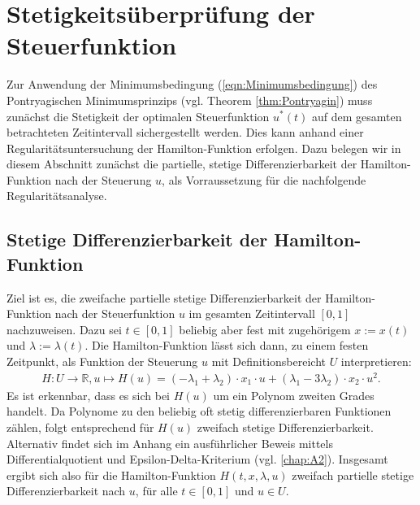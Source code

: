 \section{Stetigkeitsüberprüfung der Steuerfunktion} \label{sec:Stetigkeit}
Zur Anwendung der Minimumsbedingung (\ref{eqn:Minimumsbedingung}) des Pontryagischen Minimumsprinzips (vgl. Theorem \ref{thm:Pontryagin}) muss zunächst die Stetigkeit der optimalen Steuerfunktion $u^*(t)$ auf dem gesamten betrachteten Zeitintervall sichergestellt werden.
Dies kann anhand einer Regularitätsuntersuchung der Hamilton-Funktion erfolgen. Dazu belegen wir in diesem Abschnitt zunächst die partielle, stetige Differenzierbarkeit der Hamilton-Funktion nach der Steuerung $u$, als Vorraussetzung für die nachfolgende Regularitätsanalyse.  
\subsection{Stetige Differenzierbarkeit der Hamilton-Funktion}
Ziel ist es, die zweifache partielle stetige Differenzierbarkeit der Hamilton-Funktion nach der Steuerfunktion $u$ im gesamten Zeitintervall $[0,1]$ nachzuweisen. 
Dazu sei $t \in [0,1]$ beliebig aber fest mit zugehörigem $x:=x(t)$ und $\lambda:=\lambda(t)$. Die Hamilton-Funktion lässt sich dann, zu einem festen Zeitpunkt, als Funktion der Steuerung $u$ mit Definitionsbereicht $U$ interpretieren:
\begin{align}
	H: U \rightarrow \mathbb{R}, u \mapsto H(u) = (-\lambda_1 + \lambda_2) \cdot x_1 \cdot u + (\lambda_1 - 3 \lambda_2) \cdot x_2 \cdot u^2.
	\label{eqn:H(u)}
\end{align} 
Es ist erkennbar, dass es sich bei $H(u)$ um ein Polynom zweiten Grades handelt. Da Polynome zu den beliebig oft stetig differenzierbaren Funktionen zählen, folgt entsprechend für $H(u)$ zweifach stetige Differenzierbarkeit. Alternativ findet sich im Anhang ein ausführlicher Beweis mittels Differentialquotient und Epsilon-Delta-Kriterium (vgl. \autoref{chap:A2}). Insgesamt ergibt sich also für die Hamilton-Funktion $H(t,x,\lambda,u)$ zweifach partielle stetige Differenzierbarkeit nach $u$, für alle $t \in [0,1]$ und $u \in U$. 
